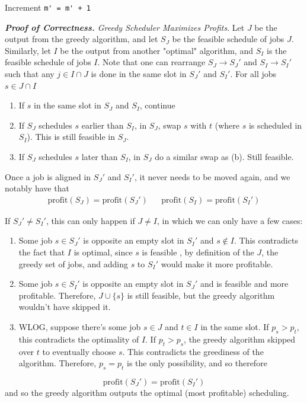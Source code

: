 \documentclass[11pt]{article}
\begin{document}
\begin{enumerate}[leftmargin=*,start=0]
\hspace{20mm} Increment \verb|m' = m' + 1|

\hfill

\textit{\textbf{Proof of Correctness.} Greedy Scheduler Maximizes Profits}.
  Let $J$ be the output from the greedy algorithm, and let $S_J$ be the feasible schedule of jobs $J$. 
  Similarly, let $I$ be the output from another "optimal" algorithm, and $S_I$ is the feasible schedule of jobs $I$. 
  Note that one can rearrange $S_J \to S_J'$ and $S_I \to S_I'$ such that any $j \in I \cap J$ is done in the same slot in 
  $S_J'$ and $S_I'$. For all jobs $s \in J \cap I$

  \begin{enumerate}
    \item If $s$ in the same slot in $S_J$ and $S_I$, continue
    \item If $S_J$ schedules $s$ earlier than $S_I$, in $S_J$, swap $s$ with $t$ (where $s$ is scheduled in $S_I$). This is still feasible in $S_J$. 
    \item If $S_J$ schedules $s$ later than $S_I$, in $S_J$ do a similar swap as (b). Still feasible. 
  \end{enumerate}
  Once a job is aligned in $S_J'$ and $S_I'$, it never needs to be moved again, and we notably have that 
  \begin{align*}
    \text{profit}(S_J) = \text{profit}(S_J') && \text{profit}(S_I) = \text{profit}(S_I')
  \end{align*}

  If $S_J' \neq S_I'$, this can only happen if $J \neq I$, in which we can only have a few cases:

\begin{enumerate}
  \item Some job $s \in S_J'$ is opposite an empty slot in $S_I'$ and $s \notin I$. This contradicts the fact that $I$ is optimal, since $s$ is feasible , by definition of the $J$, the greedy set of jobs, and adding $s$ to $S_I'$ would make it more profitable. 
  \item Some job $s \in S_I'$ is opposite an empty slot in $S_J'$ and is feasible and more profitable. Therefore, $J \cup \{s\}$ is still feasible, but the greedy algorithm wouldn't have skipped it. 
  \item WLOG, suppose there's some job $s \in J$ and $t \in I$ in the same slot. If $p_s > p_t$, this contradicts the optimality of $I$. If $p_t > p_s$, the greedy algorithm skipped over $t$ to eventually choose $s$. 
  This contradicts the greediness of the algorithm. Therefore, $p_s = p_t$ is the only possibility, and so therefore
\end{enumerate}
\[\text{profit}(S_J') = \text{profit}(S_I')\]
and so the greedy algorithm outputs the optimal (most profitable) scheduling. 


\end{enumerate}
\end{document}
